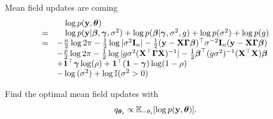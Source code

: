 \documentclass{beamer}
\begin{document}
\begin{frame}{Mean field updates are coming}
\begin{equation*}
\begin{array}{rl}
&\quad \log{p({\bf y}, {\boldsymbol\theta})} \\
=& \quad \log{p({\bf y}| {\boldsymbol\beta}, {\boldsymbol\gamma}, \sigma^2)} + \log{p({\boldsymbol\beta}| {\boldsymbol\gamma}, \sigma^2, g)} + \log{p(\sigma^2)} + \log{p(g)} \\
=& -\frac{n}{2} \log{2 \pi} -\tfrac{1}{2} \log |\sigma^2 {\bf I}_n| - \tfrac{1}{2} ({\bf y} - {\bf X} {\boldsymbol{\Gamma}} {\boldsymbol \beta})^\top \sigma^{-2} {\bf I}_n ({\bf y} - {\bf X} {\boldsymbol{\Gamma}} {\boldsymbol \beta}) \\
& -\frac{p}{2} \log{2 \pi} - \tfrac{1}{2} \log |g \sigma^2 ({\bf X}^\top {\boldsymbol{\Gamma}} {\bf X})^{-1}| -
	\tfrac{1}{2} {\boldsymbol \beta}^\top (g \sigma^2)^{-1} ({\bf X}^\top {\bf X}) {\boldsymbol \beta} \\
& + {\bf 1}^\top {\boldsymbol\gamma} \log(\rho) + {\bf 1}^\top ({\bf 1} - {\boldsymbol \gamma}) \log(1 - \rho)\\
& - \log{(\sigma^2)} + \log {\mathbb I} (\sigma^2 > 0) \\

\end{array}
\end{equation*}

Find the optimal mean field updates with
\[
q_{{\boldsymbol \theta}_i} \propto {\mathbb E}_{-\theta_i} [\log p({\bf y}, {\boldsymbol \theta})].
\]

\end{frame}
\end{document}
